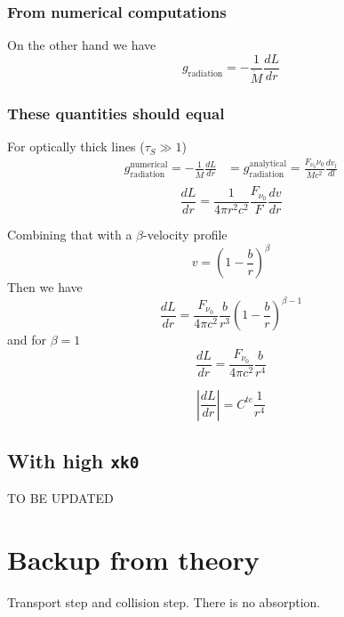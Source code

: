 \documentclass[../main/main.tex]{subfiles}
\begin{document}
\subsubsection{From numerical computations}
On the other hand we have
\begin{equation}
\boxed{g_{\text{radiation}} = - \frac{1}{\dot{M}}\frac{dL}{dr}}
\end{equation}

\subsubsection{These quantities should equal}
For optically thick lines ($\tau_S \gg 1$)
\begin{equation}
\begin{aligned}
g_{\text{radiation}}^{\text{numerical}} = -\frac{1}{\dot{M}} \frac{dL}{dr} &= g_{\text{radiation}}^{\text{analytical}} = \frac{F_{\nu_0} \nu_0 }{\dot{M} c^2} \frac{dv_l}{dl} \\
\end{aligned}
\end{equation}
\begin{equation}
\frac{dL}{dr} = \frac{1}{4 \pi r^2 c^2} \frac{F_{\nu_0}}{F} \frac{dv}{dr}
\end{equation}

Combining that with a $\beta$-velocity profile
\begin{equation}
v = \left( 1 - \frac{b}{r} \right)^{\beta} 
\end{equation}
Then we have 
\begin{equation}
\boxed{\frac{dL}{dr} = \frac{F_{\nu_0}}{4 \pi c^2} \frac{b}{r^3} \left( 1-\frac{b}{r}\right)^{\beta - 1}}
\end{equation}
and for $\beta = 1$
\begin{equation}
\frac{dL}{dr} = \frac{F_{\nu_0}}{4 \pi c^2} \frac{b}{r^4} 
\end{equation}

\begin{equation}
\left| \frac{dL}{dr} \right| = C^{te}\frac{1}{r^4}
\end{equation}

\newpage
\subsection{With high \texttt{xk0}}
TO BE UPDATED

\newpage
\section{Backup from theory}
Transport step and collision step. There is no absorption.
\end{document}
